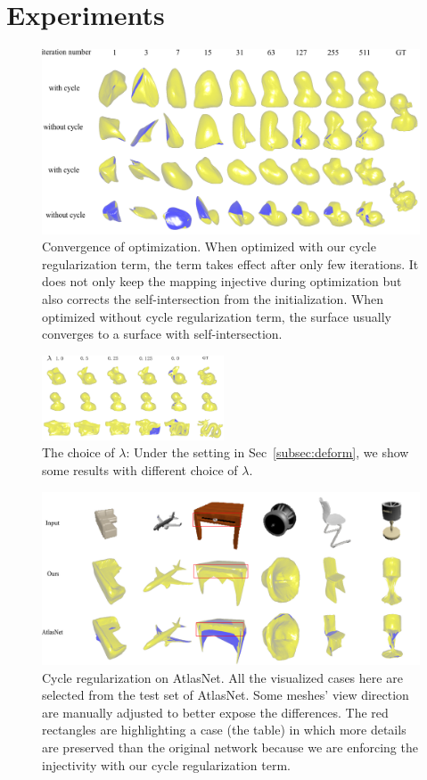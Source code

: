 \section{Experiments}
\begin{figure}[t]
	\centering
	\includegraphics[width=\linewidth]{img/opt/opt}
	\caption{Convergence of optimization. When optimized with our cycle regularization term, the term takes effect after only few iterations. It does not only keep the mapping injective during optimization but also corrects the self-intersection from the initialization. When optimized without cycle regularization term, the surface usually converges to a surface with self-intersection.}
	\label{fig:opt}
\end{figure}
\begin{figure}
	\begin{center}
		\includegraphics[width=0.48\textwidth]{img/opt/lambda}
	\end{center}
	\caption{The choice of $\lambda$: Under the setting in Sec~\ref{subsec:deform}, we show some results with different choice of $\lambda$.}
	\label{fig:lambda}
\end{figure}
\begin{figure}[t]
	\centering
	\includegraphics[width=\linewidth]{img/atlas/svr}
	\caption{Cycle regularization on AtlasNet. All the visualized cases here are selected from the test set of AtlasNet. Some meshes' view direction are manually adjusted to better expose the differences. The red rectangles are highlighting a case (the table) in which more details are preserved than the original network because we are enforcing the injectivity with our cycle regularization term.}
	\label{fig:svr}
\end{figure}
